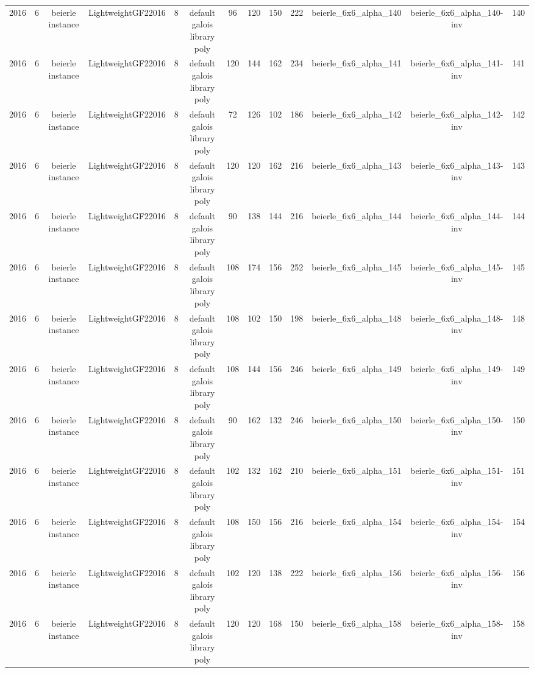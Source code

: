 \begin{tabular}{c c c c c c c c c c c c c}
2016 & 6 & beierle instance & LightweightGF22016 & 8 & default galois library poly & 96 & 120 & 150 & 222 & beierle_6x6_alpha_140 & beierle_6x6_alpha_140-inv & 140 \\
2016 & 6 & beierle instance & LightweightGF22016 & 8 & default galois library poly & 120 & 144 & 162 & 234 & beierle_6x6_alpha_141 & beierle_6x6_alpha_141-inv & 141 \\
2016 & 6 & beierle instance & LightweightGF22016 & 8 & default galois library poly & 72 & 126 & 102 & 186 & beierle_6x6_alpha_142 & beierle_6x6_alpha_142-inv & 142 \\
2016 & 6 & beierle instance & LightweightGF22016 & 8 & default galois library poly & 120 & 120 & 162 & 216 & beierle_6x6_alpha_143 & beierle_6x6_alpha_143-inv & 143 \\
2016 & 6 & beierle instance & LightweightGF22016 & 8 & default galois library poly & 90 & 138 & 144 & 216 & beierle_6x6_alpha_144 & beierle_6x6_alpha_144-inv & 144 \\
2016 & 6 & beierle instance & LightweightGF22016 & 8 & default galois library poly & 108 & 174 & 156 & 252 & beierle_6x6_alpha_145 & beierle_6x6_alpha_145-inv & 145 \\
2016 & 6 & beierle instance & LightweightGF22016 & 8 & default galois library poly & 108 & 102 & 150 & 198 & beierle_6x6_alpha_148 & beierle_6x6_alpha_148-inv & 148 \\
2016 & 6 & beierle instance & LightweightGF22016 & 8 & default galois library poly & 108 & 144 & 156 & 246 & beierle_6x6_alpha_149 & beierle_6x6_alpha_149-inv & 149 \\
2016 & 6 & beierle instance & LightweightGF22016 & 8 & default galois library poly & 90 & 162 & 132 & 246 & beierle_6x6_alpha_150 & beierle_6x6_alpha_150-inv & 150 \\
2016 & 6 & beierle instance & LightweightGF22016 & 8 & default galois library poly & 102 & 132 & 162 & 210 & beierle_6x6_alpha_151 & beierle_6x6_alpha_151-inv & 151 \\
2016 & 6 & beierle instance & LightweightGF22016 & 8 & default galois library poly & 108 & 150 & 156 & 216 & beierle_6x6_alpha_154 & beierle_6x6_alpha_154-inv & 154 \\
2016 & 6 & beierle instance & LightweightGF22016 & 8 & default galois library poly & 102 & 120 & 138 & 222 & beierle_6x6_alpha_156 & beierle_6x6_alpha_156-inv & 156 \\
2016 & 6 & beierle instance & LightweightGF22016 & 8 & default galois library poly & 120 & 120 & 168 & 150 & beierle_6x6_alpha_158 & beierle_6x6_alpha_158-inv & 158 \\

\end{tabular}
